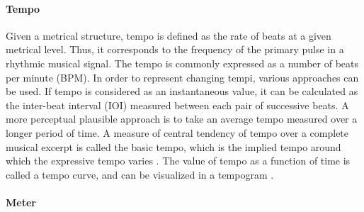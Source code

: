 \documentclass{scrartcl}
\begin{document}
\paragraph{Tempo}
Given a metrical structure, tempo is defined as the rate of beats at a given metrical level. Thus, it corresponds to the frequency of the primary pulse in a rhythmic musical signal. The tempo is commonly expressed as a number of beats per minute (BPM). In order to represent changing tempi, various approaches can be used. If tempo is considered as an instantaneous value, it can be calculated as the inter-beat interval (IOI) measured between each pair of successive beats. A more perceptual plausible approach is to take an average tempo measured over a longer period of time. A measure of central tendency of tempo over a complete musical excerpt is called the basic tempo, which is the implied tempo around which the expressive tempo varies \cite{Repp1994}. The value of tempo as a function of time is called a tempo curve, and can be visualized in a tempogram \cite{Cemgil2001}.


\paragraph{Meter} 
\end{document}
